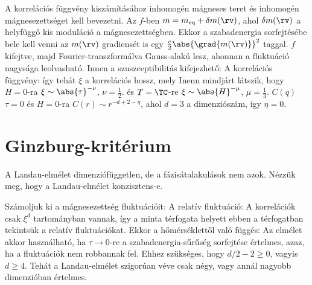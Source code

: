   A korrelációs függvény kiszámításához inhomogén mágneses teret és inhomogén mágnesezettséget kell bevezetni.
   Az $f$-ben $m=m_\text{eq}+\delta m(\rv)$, ahol $\delta m(\rv)$ a helyfüggő kis moduláció a mágnesezettségben.
   Ekkor a szabadenergia sorfejtésébe bele kell venni az $m(\rv)$ gradiensét is egy $\frac{c}{2}\abs{\grad{m(\rv)}}^2$ taggal. $f$ kifejtve, majd Fourier-transzformálva Gauss-alakú lesz, ahonnan a fluktuáció nagysága leolvasható.
   Innen a szuszceptibilitás kifejezhető:
  A korrelációs függvény:
  így tehát $\xi$ a korrelációs hossz, mely
  Inenn mindjárt látszik, hogy $H=0$-ra $\xi\sim \abs{\tau}^{-\nu}$, $\nu=\frac{1}{2}$. és $T=\TC$-re $\xi\sim \abs{H}^{-\mu}$, $\mu=\frac{1}{3}$. $C(q)$ $\tau=0$ és $H=0$-ra $C(r)\sim r^{-d+2-\eta}$, ahol $d=3$ a dimenziószám, így $\eta=0$.
  
 \section{Ginzburg-kritérium}
  
  A Landau-elmélet dimenziófüggetlen, de a fázisátalakulások nem azok.
   Nézzük meg, hogy a Landau-elmélet konzisztens-e. 
  
  Számoljuk ki a mágnesezettség fluktuációit:
  A relatív fluktuáció:
  A korrelációk csak $\xi^d$ tartományban vannak, így a minta térfogata helyett ebben a térfogatban tekintsük a relatív fluktuációkat.
   Ekkor a hőmérséklettől való függés:
  Az elmélet akkor használható, ha $\tau\to 0$-re a szabadenergia-sűrűség sorfejtése értelmes, azaz, ha a fluktuációk nem robbannak fel.
   Ehhez szükséges, hogy $d/2-2\ge 0$, vagyis $d\ge 4$.
   Tehát a Landau-elmélet szigorúan véve csak négy, vagy annál nagyobb dimenzióban értelmes.
  
